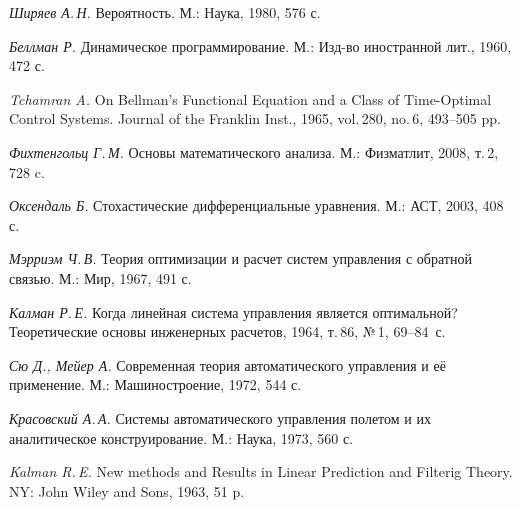 






\begin{thebibliography}{wlab}


\emph{Ширяев А.\,Н.}
\newblock Вероятность.
\newblock М.: Наука, 1980, 576 с.

\emph{Беллман Р.}
\newblock Динамическое программирование.
\newblock М.: Изд-во иностранной лит., 1960, 472 с.

\emph{Tchamran A.}
\newblock On Bellman's Functional Equation and a Class of Time-Optimal Control Systems.
\newblock Journal of the Franklin Inst., 1965, vol.\,280, no.\,6, 493--505 pp.

\emph{Фихтенгольц Г.\,М.}
\newblock Основы математического анализа.
\newblock М.: Физматлит, 2008, т.\,2, 728 c.

\emph{Оксендаль Б.}
\newblock Стохастические дифференциальные уравнения.
\newblock М.: АСТ, 2003, 408 с.

\emph{Мэрриэм Ч.\,В.}
\newblock Теория оптимизации и расчет систем управления с обратной связью.
\newblock М.: Мир, 1967, 491 с.

\emph{Калман Р.\,Е.}
\newblock Когда линейная система управления является оптимальной?
\newblock Теоретические основы инженерных расчетов, 1964, т.\,86, №\,1, 69--84~с.

\newpage

\emph{Сю Д., Мейер А.}
\newblock Современная теория автоматического управления и её применение.
\newblock М.: Машиностроение, 1972, 544 с.

\emph{Красовский А.\,А.}
\newblock Системы автоматического управления полетом и их аналитическое конструирование.
\newblock М.: Наука, 1973, 560 с.

\emph{Kalman R.\,E.}
\newblock New methods and Results in Linear Prediction and Filterig Theory.
\newblock NY: John Wiley and Sons, 1963, 51 p.


\end{thebibliography}
